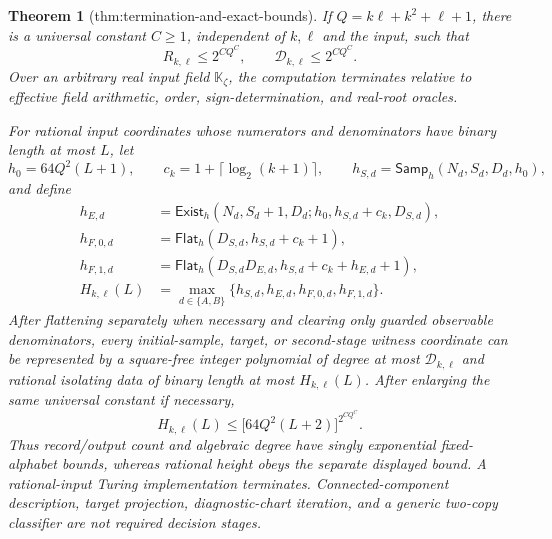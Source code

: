 \documentclass{article}
\newtheorem{theorem}{Theorem}
\begin{document}
\begin{theorem}[thm:termination-and-exact-bounds]
If \(Q=k\ell+k^2+\ell+1\), there is a universal constant \(C\ge1\), independent of \(k,\ell\) and the input, such that
\[
 R_{k,\ell}\le 2^{CQ^C},
 \qquad
 \mathcal D_{k,\ell}\le 2^{CQ^C}.
\]
Over an arbitrary real input field \(\mathbb K_{\zeta}\), the computation terminates relative to effective field arithmetic, order, sign-determination, and real-root oracles.

For rational input coordinates whose numerators and denominators have binary length at most \(L\), let
\[
 h_0=64Q^2(L+1),
 \qquad
 c_k=1+\lceil\log_2(k+1)\rceil,
 \qquad
 h_{S,d}=\mathsf{Samp}_h(N_d,S_d,D_d,h_0),
\]
and define
\[
 \begin{aligned}
 h_{E,d}
 &=\mathsf{Exist}_h
   (N_d,S_d+1,D_d;h_0,h_{S,d}+c_k,D_{S,d}),\\
 h_{F,0,d}
 &=\mathsf{Flat}_h(D_{S,d},h_{S,d}+c_k+1),\\
 h_{F,1,d}
 &=\mathsf{Flat}_h
   (D_{S,d}D_{E,d},h_{S,d}+c_k+h_{E,d}+1),\\
 H_{k,\ell}(L)
 &=\max_{d\in\{A,B\}}
   \{h_{S,d},h_{E,d},h_{F,0,d},h_{F,1,d}\}.
 \end{aligned}
\]
After flattening separately when necessary and clearing only guarded observable denominators, every initial-sample, target, or second-stage witness coordinate can be represented by a square-free integer polynomial of degree at most \(\mathcal D_{k,\ell}\) and rational isolating data of binary length at most \(H_{k,\ell}(L)\).  After enlarging the same universal constant if necessary,
\[
 H_{k,\ell}(L)
 \le \bigl[64Q^2(L+2)\bigr]^{2^{CQ^C}}.
\]
Thus record/output count and algebraic degree have singly exponential fixed-alphabet bounds, whereas rational height obeys the separate displayed bound.  A rational-input Turing implementation terminates.  Connected-component description, target projection, diagnostic-chart iteration, and a generic two-copy classifier are not required decision stages.
\end{theorem}
\end{document}
